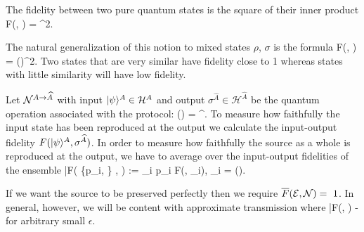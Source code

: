 \documentclass[aps,11pt,twoside,letterpaper]{article}
\def\E{\mathcal{E}}
\def\cH{\mathcal{H}}
\begin{document}
			The fidelity between two pure  quantum states is the square of their inner product
			\be
				F(\ket{\varphi}, \ket{\psi}) = \left\vert \braket{\varphi}{\psi} \right\vert^2.
			\ee
			
			The natural generalization of this notion to mixed states $\rho$, $\sigma$ is
			the formula
	    	\be
	    		F(\rho, \sigma) = \left(\sqrt{\sqrt{\rho}\sigma\sqrt{\rho}}\right)^2.
	    	\ee
		    Two states that are very similar have fidelity close to 1 whereas states with little similarity 
		    will have low fidelity.
		    

			Let ${\cal N}^{A \to \widehat{A}}$ with input $\ket{\psi}^A \in \cH^A$ and output 
		    $\sigma^{\widehat{A}} \in \cH^{\widehat{A}}$ be the quantum operation associated with the protocol:
			\be
				\cN(\proj{\psi}) = \sigma^{}.
			\ee
			To measure how faithfully the input state has been reproduced at the output we calculate the 
			input-output fidelity $F(| \psi \rangle^A, \sigma^{\widehat{A}})$. 
			In order to measure how faithfully the source as a whole is reproduced at the output, 
			we have to average over the input-output fidelities of the ensemble
			\be
				\bar{F}\!\left( \{p_i,  \}  , \cN\right) :=	\sum_i	p_i F(, \sigma_i), 
				\qquad \sigma_i = \cN().
			\ee

			If we want the source to be preserved perfectly then we require $\bar{F}(\E, \cN)=~1$.
			In general, however, we will be content with approximate transmission where
			\be \label{eqn:MixedFidDef}
				\bar{F}\!\left(\E, \cN\right)  - \epsilon
			\ee
			for arbitrary small $\epsilon$.

			
\end{document}
